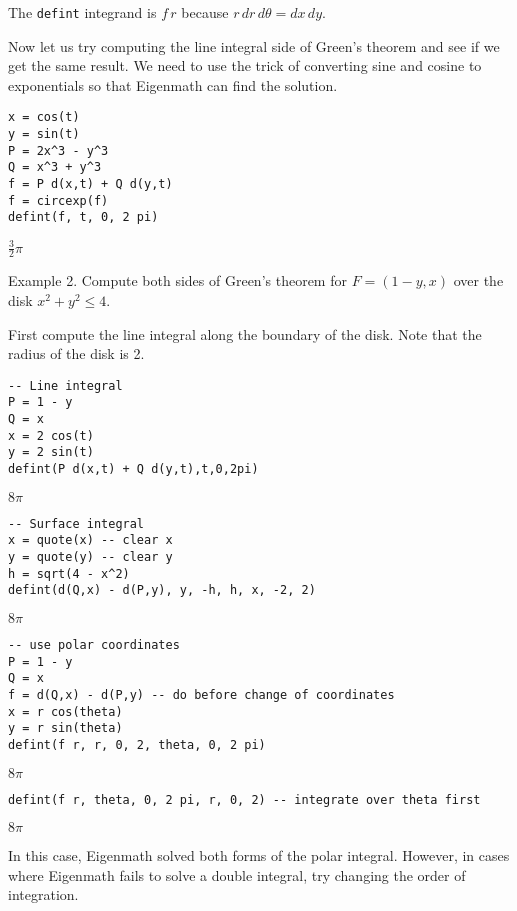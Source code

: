 \documentclass[12pt]{article}
\begin{document}
\bigskip
The \verb$defint$ integrand is $f\,r$ because $r\,dr\,d\theta=dx\,dy$.

\bigskip
Now let us try computing the line integral side of Green's theorem
and see if we get the same result.
We need to use the trick of converting sine and cosine to exponentials
so that Eigenmath can find the solution.

{\color{blue}
\begin{verbatim}
x = cos(t)
y = sin(t)
P = 2x^3 - y^3
Q = x^3 + y^3
f = P d(x,t) + Q d(y,t)
f = circexp(f)
defint(f, t, 0, 2 pi)
\end{verbatim}
}

$\displaystyle \tfrac{3}{2}\pi$

\bigskip
Example 2.
Compute both sides of Green's theorem for
$F=(1-y,x)$ over the disk $x^2+y^2\le4$.

\bigskip
First compute the line integral along the boundary of the disk.
Note that the radius of the disk is 2.

{\color{blue}
\begin{verbatim}
-- Line integral
P = 1 - y
Q = x
x = 2 cos(t)
y = 2 sin(t)
defint(P d(x,t) + Q d(y,t),t,0,2pi)
\end{verbatim}
}

$\displaystyle 8\pi$

{\color{blue}
\begin{verbatim}
-- Surface integral
x = quote(x) -- clear x
y = quote(y) -- clear y
h = sqrt(4 - x^2)
defint(d(Q,x) - d(P,y), y, -h, h, x, -2, 2)
\end{verbatim}
}

$\displaystyle 8\pi$

{\color{blue}
\begin{verbatim}
-- use polar coordinates
P = 1 - y
Q = x
f = d(Q,x) - d(P,y) -- do before change of coordinates
x = r cos(theta)
y = r sin(theta)
defint(f r, r, 0, 2, theta, 0, 2 pi)
\end{verbatim}
}

$\displaystyle 8\pi$

{\color{blue}
\begin{verbatim}
defint(f r, theta, 0, 2 pi, r, 0, 2) -- integrate over theta first
\end{verbatim}
}

$\displaystyle 8\pi$

\bigskip
In this case, Eigenmath solved both forms of the polar integral.
However, in cases where Eigenmath fails to solve a double integral, try
changing the order of integration.
\end{document}
